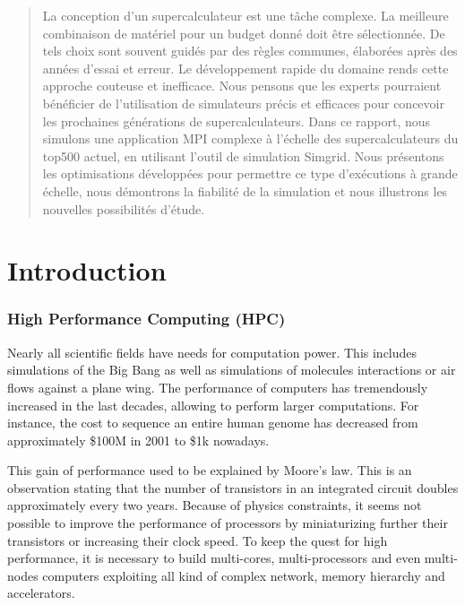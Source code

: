 \documentclass[12pt, a4paper]{memoir}
\begin{document}
\renewcommand\abstractname{Résumé}
\begin{abstract} 
La conception d'un supercalculateur est une tâche complexe. La meilleure combinaison de matériel pour un budget donné
doit être sélectionnée. De tels choix sont souvent guidés par des règles communes, élaborées après des années d'essai
et erreur. Le développement rapide du domaine rends cette approche couteuse et inefficace. Nous pensons que les experts
pourraient bénéficier de l'utilisation de simulateurs précis et efficaces pour concevoir les prochaines générations
de supercalculateurs. Dans ce rapport, nous simulons une application MPI complexe à l'échelle des supercalculateurs du
top500 actuel, en utilisant l'outil de simulation Simgrid. Nous présentons les optimisations développées pour permettre
ce type d'exécutions à grande échelle, nous démontrons la fiabilité de la simulation et nous illustrons les nouvelles
possibilités d'étude.
\end{abstract}

\cleardoublepage

\tableofcontents* %
\normalsize

\mainmatter
\SingleSpace


\chapter{Introduction}
\label{sec:orgc117885}
\subsection{High Performance Computing (HPC)}
\label{sec:org0358c93}
Nearly all scientific fields have needs for computation power. This includes simulations of the Big Bang as well as
simulations of molecules interactions or air flows against a plane wing. The performance of computers has
tremendously increased in the last decades, allowing to perform larger computations. For instance, the cost to
sequence an entire human genome has decreased from approximately \$100M in 2001 to \$1k nowadays.

This gain of performance used to be explained by Moore's law. This is an observation stating that the number of
transistors in an integrated circuit doubles approximately every two years. Because of physics constraints, it seems
not possible to improve the performance of processors by miniaturizing further their transistors or increasing their
clock speed. To keep the quest for high performance, it is necessary to build multi-cores, multi-processors and
even multi-nodes computers exploiting all kind of complex network, memory hierarchy and accelerators.
\end{document}
